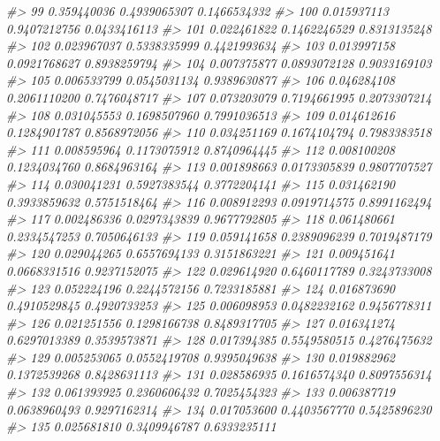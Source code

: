 \documentclass[
  oneside]{book}
\newenvironment{Shaded}{\begin{snugshade}}{\end{snugshade}}
\newcommand{\CommentTok}[1]{\textcolor[rgb]{0.56,0.35,0.01}{\textit{#1}}}
\begin{document}
\begin{Shaded}
\begin{Highlighting}[]
\CommentTok{\#\textgreater{} 99  0.359440036 0.4939065307 0.1466534332}
\CommentTok{\#\textgreater{} 100 0.015937113 0.9407212756 0.0433416113}
\CommentTok{\#\textgreater{} 101 0.022461822 0.1462246529 0.8313135248}
\CommentTok{\#\textgreater{} 102 0.023967037 0.5338335999 0.4421993634}
\CommentTok{\#\textgreater{} 103 0.013997158 0.0921768627 0.8938259794}
\CommentTok{\#\textgreater{} 104 0.007375877 0.0893072128 0.9033169103}
\CommentTok{\#\textgreater{} 105 0.006533799 0.0545031134 0.9389630877}
\CommentTok{\#\textgreater{} 106 0.046284108 0.2061110200 0.7476048717}
\CommentTok{\#\textgreater{} 107 0.073203079 0.7194661995 0.2073307214}
\CommentTok{\#\textgreater{} 108 0.031045553 0.1698507960 0.7991036513}
\CommentTok{\#\textgreater{} 109 0.014612616 0.1284901787 0.8568972056}
\CommentTok{\#\textgreater{} 110 0.034251169 0.1674104794 0.7983383518}
\CommentTok{\#\textgreater{} 111 0.008595964 0.1173075912 0.8740964445}
\CommentTok{\#\textgreater{} 112 0.008100208 0.1234034760 0.8684963164}
\CommentTok{\#\textgreater{} 113 0.001898663 0.0173305839 0.9807707527}
\CommentTok{\#\textgreater{} 114 0.030041231 0.5927383544 0.3772204141}
\CommentTok{\#\textgreater{} 115 0.031462190 0.3933859632 0.5751518464}
\CommentTok{\#\textgreater{} 116 0.008912293 0.0919714575 0.8991162494}
\CommentTok{\#\textgreater{} 117 0.002486336 0.0297343839 0.9677792805}
\CommentTok{\#\textgreater{} 118 0.061480661 0.2334547253 0.7050646133}
\CommentTok{\#\textgreater{} 119 0.059141658 0.2389096239 0.7019487179}
\CommentTok{\#\textgreater{} 120 0.029044265 0.6557694133 0.3151863221}
\CommentTok{\#\textgreater{} 121 0.009451641 0.0668331516 0.9237152075}
\CommentTok{\#\textgreater{} 122 0.029614920 0.6460117789 0.3243733008}
\CommentTok{\#\textgreater{} 123 0.052224196 0.2244572156 0.7233185881}
\CommentTok{\#\textgreater{} 124 0.016873690 0.4910529845 0.4920733253}
\CommentTok{\#\textgreater{} 125 0.006098953 0.0482232162 0.9456778311}
\CommentTok{\#\textgreater{} 126 0.021251556 0.1298166738 0.8489317705}
\CommentTok{\#\textgreater{} 127 0.016341274 0.6297013389 0.3539573871}
\CommentTok{\#\textgreater{} 128 0.017394385 0.5549580515 0.4276475632}
\CommentTok{\#\textgreater{} 129 0.005253065 0.0552419708 0.9395049638}
\CommentTok{\#\textgreater{} 130 0.019882962 0.1372539268 0.8428631113}
\CommentTok{\#\textgreater{} 131 0.028586935 0.1616574340 0.8097556314}
\CommentTok{\#\textgreater{} 132 0.061393925 0.2360606432 0.7025454323}
\CommentTok{\#\textgreater{} 133 0.006387719 0.0638960493 0.9297162314}
\CommentTok{\#\textgreater{} 134 0.017053600 0.4403567770 0.5425896230}
\CommentTok{\#\textgreater{} 135 0.025681810 0.3409946787 0.6333235111}

\end{Highlighting}
\end{Shaded}
\end{document}
